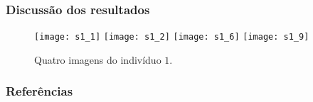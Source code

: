 \documentclass[15pt]{beamer}
\begin{document}
\begin{frame}
    \frametitle{Discussão dos resultados}

    \begin{figure}
        \texttt{[image: s1\_1]}\hfill
        \texttt{[image: s1\_2]}\hfill
        \texttt{[image: s1\_6]}\hfill
        \texttt{[image: s1\_9]}
        \caption{Quatro imagens do indivíduo \( 1 \).}
        \label{fig: ind1}
    \end{figure}

\end{frame}

\begin{frame}
\frametitle{Referências}
    
    
\end{frame}
\end{document}
